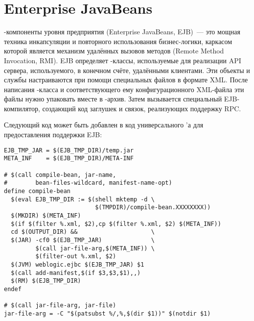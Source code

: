 \section{Enterprise JavaBeans}

\Java{}\hyp{}компоненты уровня предприятия (Enterprise
Java\-Beans\trademark{}, EJB)~--- это мощная техника инкапсуляции и
повторного использования бизнес\hyp{}логики, каркасом которой является
механизм удалённых вызовов методов (Remote Method Invocation, RMI).
EJB определяет \Java{}\hyp{}классы, используемые для реализации API
сервера, используемого, в конечном счёте, удалёнными клиентами. Эти
объекты и службы настраиваются при помощи специальных файлов в формате
XML.  После написания \Java{}\hyp{}класса и соответствующего ему
конфигурационного XML\hyp{}файла эти файлы нужно упаковать вместе в
\Java{}\hyp{}архив. Затем вызывается специальный EJB\hyp{}компилятор,
создающий код заглушек и связок, реализующих поддержку RPC.

Следующий код может быть добавлен в код универсального \Makefile{}'а
для предоставления поддержки EJB:

{\footnotesize
\begin{verbatim}
EJB_TMP_JAR = $(EJB_TMP_DIR)/temp.jar
META_INF    = $(EJB_TMP_DIR)/META-INF

# $(call compile-bean, jar-name,
#        bean-files-wildcard, manifest-name-opt)
define compile-bean
  $(eval EJB_TMP_DIR := $(shell mktemp -d \
                          $(TMPDIR)/compile-bean.XXXXXXXX))
  $(MKDIR) $(META_INF)
  $(if $(filter %.xml, $2),cp $(filter %.xml, $2) $(META_INF))
  cd $(OUTPUT_DIR) &&                     \
  $(JAR) -cf0 $(EJB_TMP_JAR)              \
         $(call jar-file-arg,$(META_INF)) \
         $(filter-out %.xml, $2)
  $(JVM) weblogic.ejbc $(EJB_TMP_JAR) $1
  $(call add-manifest,$(if $3,$3,$1),,)
  $(RM) $(EJB_TMP_DIR)
endef

# $(call jar-file-arg, jar-file)
jar-file-arg = -C "$(patsubst %/,%,$(dir $1))" $(notdir $1)
\end{verbatim}
}

